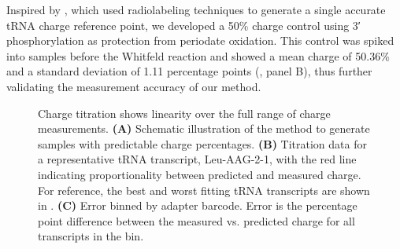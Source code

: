 \documentclass[9pt,lineno]{elife}
\begin{document}
Inspired by \cite{Evans2017-st}, which used radiolabeling techniques to generate a single accurate tRNA charge reference point, we developed a 50\% charge control using 3′ phosphorylation as protection from periodate oxidation.
This control was spiked into samples before the Whitfeld reaction and showed a mean charge of 50.36\% and a standard deviation of 1.11 percentage points (, panel B), thus further validating the measurement accuracy of our method.

\begin{figure}[ht!]
\centering
{}
\caption{
Charge titration shows linearity over the full range of charge measurements.
\textbf{(A)} Schematic illustration of the method to generate samples with predictable charge percentages.
\textbf{(B)} Titration data for a representative tRNA transcript, Leu-AAG-2-1, with the red line indicating proportionality between predicted and measured charge.
For reference, the best and worst fitting tRNA transcripts are shown in .
\textbf{(C)} Error binned by adapter barcode.
Error is the percentage point difference between the measured vs. predicted charge for all transcripts in the bin.
}
\label{fig:Fig5}

\label{figsupp:f5S1}


\end{figure}
\end{document}
